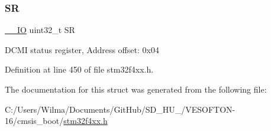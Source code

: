 \subsubsection{\texorpdfstring{SR}{SR}}
{\footnotesize\ttfamily \hyperlink{group___c_m_s_i_s__core__definitions_gaec43007d9998a0a0e01faede4133d6be}{\+\_\+\+\_\+\+IO} uint32\+\_\+t SR}

D\+C\+MI status register, Address offset\+: 0x04 

Definition at line 450 of file stm32f4xx.\+h.



The documentation for this struct was generated from the following file\+:\begin{DoxyCompactItemize}
\item 
C\+:/\+Users/\+Wilma/\+Documents/\+Git\+Hub/\+S\+D\+\_\+\+H\+U\+\_/\+V\+E\+S\+O\+F\+T\+O\+N-\/16/cmsis\+\_\+boot/\hyperlink{stm32f4xx_8h}{stm32f4xx.\+h}\end{DoxyCompactItemize}
